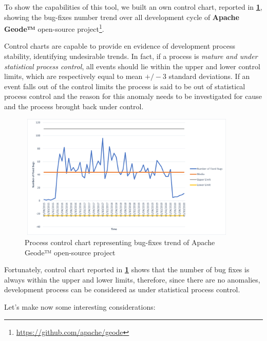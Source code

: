 \documentclass[sigconf]{acmart}
\begin{document}
To show the capabilities of this tool, we built an own control chart, reported in \textbf{\cref{ProcessControl}}, showing the bug-fixes number trend over all development cycle of \textbf{Apache Geode™} open-source project\footnote{\url{https://github.com/apache/geode}}.

Control charts are capable to provide en evidence of development process stability, identifying undesirable trends. In fact, if a process is \textit{mature and under statistical process control}, all events should lie within the upper and lower control limits, which are respectively equal to mean $+/-3$ standard deviations. If an event falls out of the control limits the process is said to be out of statistical process control and the reason for this anomaly needs to be investigated for cause and the process brought back under control\cite{FLORENCE}. 

\begin{figure}[h!]
  \centering
  \includegraphics[width=10.5cm, height=6cm]{./ProcessControlChart.png}
  \caption{Process control chart representing bug-fixes trend of Apache Geode™ open-source project}
  \label{ProcessControl}
\end{figure}

Fortunately, control chart reported in \textbf{\cref{ProcessControl}} shows that the number of bug fixes is always within the upper and lower limits, therefore, since there are no anomalies, development process can be considered as under statistical process control.

Let's make now some interesting considerations:
\end{document}
